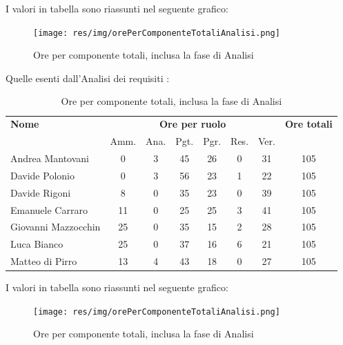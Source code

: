 I valori in tabella sono riassunti nel seguente grafico: \\ 

    \begin{figure}[H]
      \begin{center}
        \texttt{[image: res/img/orePerComponenteTotaliAnalisi.png]}
      \caption{Ore per componente totali, inclusa la fase di Analisi}
      \end{center} 
    \end{figure}    
    

Quelle esenti dall'Analisi dei requisiti :

\begin{table}[H]
\begin{tabular}{lccccccc}
\toprule
    \textbf{Nome}  & \multicolumn{6}{c}{\textbf{Ore per ruolo}} & \textbf{Ore totali} \\
     & Amm. & Ana. & Pgt. & Pgr. & Res. & Ver. & \\
    \midrule
   
	   Andrea Mantovani & 0 & 3 & 45 & 26 & 0 & 31 & 105 \\
	     Davide Polonio & 0 & 3 & 56 & 23 & 1 & 22 & 105 \\
	      Davide Rigoni & 8 & 0 & 35 & 23 & 0 & 39 & 105 \\
	   Emanuele Carraro & 11 & 0 & 25 & 25 & 3 & 41 & 105 \\
	Giovanni Mazzocchin & 25 & 0 & 35 & 15 & 2 & 28 & 105 \\
	        Luca Bianco & 25 & 0 & 37 & 16 & 6 & 21 & 105 \\
	    Matteo di Pirro & 13 & 4 & 43 & 18 & 0 & 27 & 105 \\
   
    \bottomrule
\end{tabular}
\caption{Ore per componente totali, inclusa la fase di Analisi}
\end{table}

I valori in tabella sono riassunti nel seguente grafico: \\ 

    \begin{figure}[H]
      \begin{center}
        \texttt{[image: res/img/orePerComponenteTotaliAnalisi.png]}
      \caption{Ore per componente totali, inclusa la fase di Analisi}
      \end{center} 
    \end{figure}    
    
    
